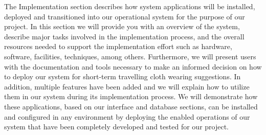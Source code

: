 \documentclass{sig-alternate}
\begin{document}
	The Implementation section describes how system applications will be installed, deployed and 				transitioned into our operational system for the purpose of our project. In this section we will 			provide you with an overview of the system, describe major tasks involved in the implementation 			process, and the overall resources needed to support the implementation effort such as hardware, 			software, facilities, techniques, among others. Furthermore, we will present users with the 				documentation and tools necessary to make an informed decision on how to deploy our system for 			short-term travelling cloth wearing suggestions. In addition, multiple features have been added and 		we will explain how to utilize them in our system during its implementation process. We will 				demonstrate how these applications, based on our interface and database sections, can be installed 		and configured in any environment by deploying the enabled operations of our system that have been 		completely developed and tested for our project.
\end{document}
